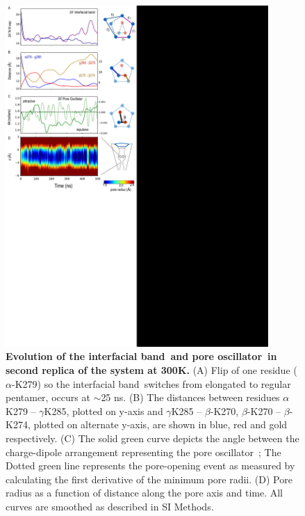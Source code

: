 \documentclass[9pt,onecolumn,oneside,lineno]{pnas-new}
\newcommand{\fivering}{interfacial band~}
\newcommand{\triad}{pore oscillator~}
\begin{document}
\begin{figure}
\begin{center}
\includegraphics[width = 100mm]{figures_2/pore_opening_events_M300_2.pdf}
\end{center}
\caption{{\bf Evolution of the \fivering and \triad in second replica of the \MT system at 300K.} (A)  Flip of one residue ($\alpha$-K279) so the \fivering switches from elongated to regular pentamer, occurs at $\sim$25 ns. (B) The distances between residues $\alpha$K279 -- $\gamma$K285, plotted on y-axis and  $\gamma$K285 -- $\beta$-K270, $\beta$-K270 -- $\beta$-K274, plotted on alternate y-axis, are shown in blue, red and gold respectively. (C) The solid green curve depicts the angle between the charge-dipole arrangement representing the \triad; The Dotted green line represents the pore-opening event as measured by calculating the  first derivative of the minimum pore radii. (D) Pore radius as a function of distance along the pore axis and time.  All curves are smoothed as described in SI Methods.}
\label{fig:M300_2}
\end{figure}
\end{document}

